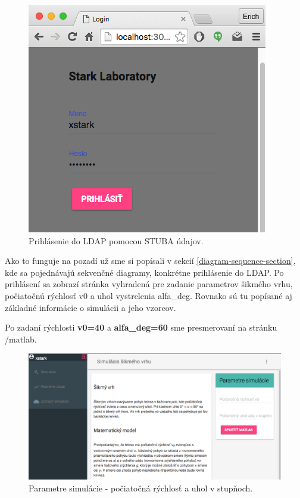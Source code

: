 \begin{figure}[H]
  \centering
  \includegraphics[scale=0.45]{img/code/angular-login.png}
  \caption{Prihlásenie do LDAP pomocou STUBA údajov.}
  \label{img-angular-login}
\end{figure}

Ako to funguje na pozadí už sme si popísali v sekcií \ref{diagram-sequence-section}, kde sa pojednávajú sekvenčné diagramy, konkrétne prihlásenie do LDAP.
Po prihlásení sa zobrazí stránka vyhradená pre zadanie parametrov šikmého vrhu, počiatočnú rýchlosť v0 a uhol vystrelenia alfa\_deg. Rovnako sú tu popísané aj základné informácie o simulácii a jeho vzorcov.

Po zadaní rýchlosti \textbf{v0=40} a \textbf{alfa\_deg=60} sme presmerovaní na stránku /matlab.

\begin{figure}[H]
  \centering
  \includegraphics[scale=0.42]{img/code/angular-simulation-param.png}
  \caption{Parametre simulácie - počiatočná rýchlosť a uhol v stupňoch.}
  \label{img-angular-params}
\end{figure}

